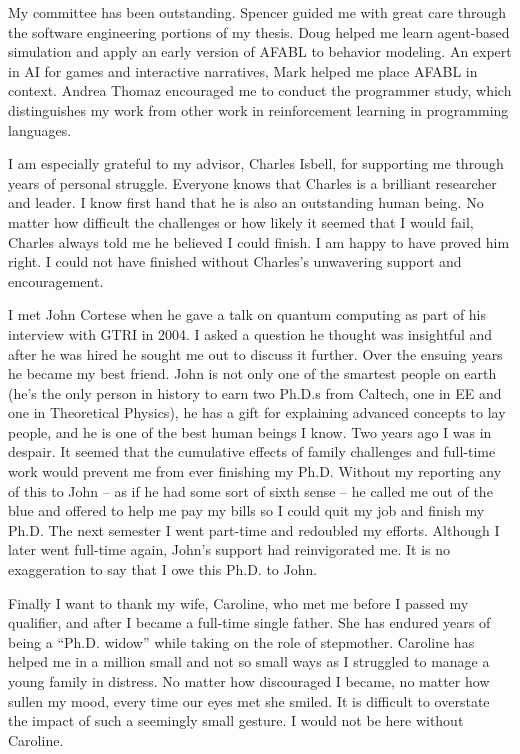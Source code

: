 My committee has been outstanding. Spencer guided me with great care through the software engineering portions of my thesis. Doug helped me learn agent-based simulation and apply an early version of AFABL to behavior modeling. An expert in AI for games and interactive narratives, Mark helped me place AFABL in context. Andrea Thomaz encouraged me to conduct the programmer study, which distinguishes my work from other work in reinforcement learning in programming languages.

I am especially grateful to my advisor, Charles Isbell, for supporting me through years of personal struggle. Everyone knows that Charles is a brilliant researcher and leader. I know first hand that he is also an outstanding human being. No matter how difficult the challenges or how likely it seemed that I would fail, Charles always told me he believed I could finish. I am happy to have proved him right. I could not have finished without Charles's unwavering support and encouragement.

\newpage

I met John Cortese when he gave a talk on quantum computing as part of his interview with GTRI in 2004. I asked a question he thought was insightful and after he was hired he sought me out to discuss it further. Over the ensuing years he became my best friend. John is not only one of the smartest people on earth (he's the only person in history to earn two Ph.D.s from Caltech, one in EE and one in Theoretical Physics), he has a gift for explaining advanced concepts to lay people, and he is one of the best human beings I know. Two years ago I was in despair. It seemed that the cumulative effects of family challenges and full-time work would prevent me from ever finishing my Ph.D. Without my reporting any of this to John -- as if he had some sort of sixth sense -- he called me out of the blue and offered to help me pay my bills so I could quit my job and finish my Ph.D. The next semester I went part-time and redoubled my efforts. Although I later went full-time again, John's support had reinvigorated me. It is no exaggeration to say that I owe this Ph.D. to John.

Finally I want to thank my wife, Caroline, who met me before I passed my qualifier, and after I became a full-time single father. She has endured years of being a ``Ph.D. widow'' while taking on the role of stepmother. Caroline has helped me in a million small and not so small ways as I struggled to manage a young family in distress. No matter how discouraged I became, no matter how sullen my mood, every time our eyes met she smiled. It is difficult to overstate the impact of such a seemingly small gesture. I would not be here without Caroline.

\clearpage
